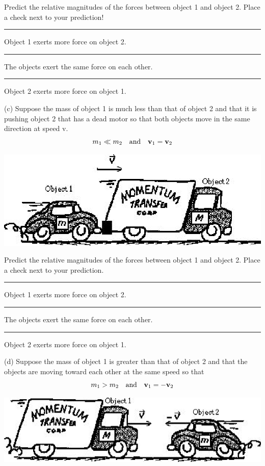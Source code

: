 Predict the relative magnitudes of the forces between object 1 and object 2.
Place a check next to your prediction! 

\rule{0.5in}{0.1pt} Object 1 exerts more force on object 2. 

\rule{0.5in}{0.1pt} The objects exert the same force on each other. 

\rule{0.5in}{0.1pt} Object 2 exerts more force on object 1.

(c) Suppose the mass of object 1 is much less than that of object 2 and that
it is pushing object 2 that has a dead motor so that both objects move in the
same direction at speed v.
\[
m_{1}\ll m_{2}\quad \mbox{and}\quad {{\bf v}_{1}}={{\bf v}_{2}}\]


\vspace{0.3cm}
{\par\centering \includegraphics{momentum/newtons_laws_fig3.eps} \par}
\vspace{0.3cm}

Predict the relative magnitudes of the forces between object 1 and object 2.
Place a check next to your prediction. 

\rule{0.5in}{0.1pt} Object 1 exerts more force on object 2. 

\rule{0.5in}{0.1pt} The objects exert the same force on each other. 

\rule{0.5in}{0.1pt} Object 2 exerts more force on object 1.

\newpage

(d) Suppose the mass of object 1 is greater than that of object 2 and that the
objects are moving toward each other at the same speed so that
\[
m_{1}>m_{2}\quad \mbox{and}\quad {{\bf v}_{1}}=-{{\bf v}_{2}}\]


\vspace{0.3cm}
{\par\centering \includegraphics{momentum/newtons_laws_fig4.eps} \par}
\vspace{0.3cm}

